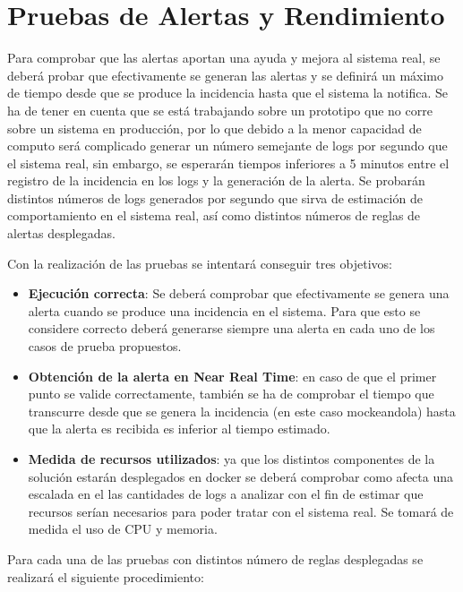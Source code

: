 \section{Pruebas de Alertas y Rendimiento}

Para comprobar que las alertas aportan una ayuda y mejora al sistema real, se deberá probar que efectivamente se generan las alertas y se definirá un máximo de tiempo desde que se produce la incidencia hasta que el sistema la notifica. Se ha de tener en cuenta que se está trabajando sobre un prototipo que no corre sobre un sistema en producción, por lo que debido a la menor capacidad de computo será complicado generar un número semejante de logs por segundo que el sistema real, sin embargo, se esperarán tiempos inferiores a 5 minutos entre el registro de la incidencia en los logs y la generación de la alerta. Se probarán distintos números de logs generados por segundo que sirva de estimación de comportamiento en el sistema real, así como distintos números de reglas de alertas desplegadas.

Con la realización de las pruebas se intentará conseguir tres objetivos:

\begin{itemize}


	\item \textbf{Ejecución correcta}: Se deberá comprobar que efectivamente se genera una alerta cuando se produce una incidencia en el sistema. Para que esto se considere correcto deberá generarse siempre una alerta en cada uno de los casos de prueba propuestos.

	\item \textbf{Obtención de la alerta en Near Real Time}: en caso de que el primer punto se valide correctamente, también se ha de comprobar el tiempo que transcurre desde que se genera la incidencia (en este caso mockeandola) hasta que la alerta es recibida es inferior al tiempo estimado.

	\item \textbf{Medida de recursos utilizados}: ya que los distintos componentes de la solución estarán desplegados en docker se deberá comprobar como afecta una escalada en el las cantidades de logs a analizar con el fin de estimar que recursos serían necesarios para poder tratar con el sistema real. Se tomará de medida el uso de CPU y memoria.

\end{itemize}

Para cada una de las pruebas con distintos número de reglas desplegadas se realizará el siguiente procedimiento:

